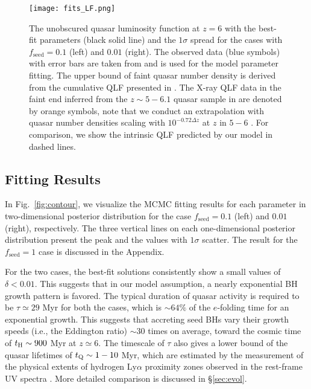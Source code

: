 \documentclass[twocolumn, twocolappendix]{aastex63}
\newcommand{\tlife}{\tau}
\newcommand{\fseed}{f_\mathrm{seed}}
\newcommand{\red}[1]{\textcolor{red}{ #1}}
\begin{document}
\begin{CJK*}{UTF8}{gbsn}
\begin{figure*}
\centering
\texttt{[image: fits\_LF.png]}
\caption{
The unobscured quasar luminosity function at $z=6$ with the best-fit parameters (black solid line) and the $1\sigma$ spread for the cases with $\fseed=0.1$ (left) and $0.01$ (right).
The observed data (blue symbols) with error bars are taken from  and is used for the model parameter fitting.
The upper bound of faint quasar number density is derived from the cumulative QLF presented in \citet{2022NatAs...6..850J}.
The X-ray QLF data in the faint end inferred from the $z\sim 5-6.1$ quasar sample in \citet{2019ApJ...884...19G} are denoted by orange symbols,
note that we conduct an extrapolation with quasar number densities scaling with $10^{-0.72\Delta z}$ at $z$ in $5-6$ \citep{2016ApJ...833..222J}.
For comparison, we show the intrinsic QLF predicted by our model in dashed lines.
}
\label{fig:fitlf}
\end{figure*}



\vspace{2mm}
\subsection{Fitting Results}\label{sec:fitting_result}
In Fig.~\ref{fig:contour}, we visualize the MCMC fitting results for each parameter in two-dimensional 
posterior distribution for the case $\fseed= 0.1$ (left) and $0.01$ (right), respectively.
The three vertical lines on each one-dimensional posterior distribution present the peak and the values
with $1\sigma$ scatter.
The result for the $\fseed=1$ case is discussed in the Appendix.


For the two cases, the best-fit solutions consistently show a small values of $\delta < 0.01$.
This suggests that in our model assumption, a nearly exponential BH growth pattern is favored. 
The typical duration of quasar activity is required to be $\tlife \simeq 29$ Myr for both the cases, 
which is $\sim 64\%$ of the $e$-folding time for an exponential growth.
This suggests that accreting seed BHs vary their growth speeds (i.e., the Eddington ratio) 
$\sim 30$ times on average, toward the cosmic time of $t_{\rm H} \sim 900$ Myr at $z\simeq 6$.
The timescale of $\tlife$ also gives a lower bound of the quasar lifetimes of $t_{\rm Q}\sim 1-10$ Myr, 
which are estimated by the measurement of the physical extents of hydrogen Ly$\alpha$ proximity zones 
observed in the rest-frame UV spectra \citep[e.g.,][]{2018ApJ...867...30E,2019ApJ...884L..19D}.
More detailed comparison is discussed in \S\ref{sec:evol}.



\end{CJK*}
\end{document}
